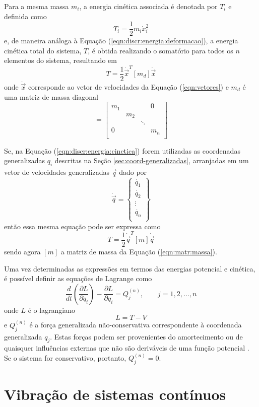 \documentclass[12pt,openright,oneside,a4paper,
	chapter=TITLE,section=TITLE,
	english,brazil]{abntex2}
\begin{document}
	Para a mesma massa $m_i$, a energia cinética associada é denotada por $T_i$ e definida como \cite{rao:2008}
	\begin{equation}
		T_i = \frac{1}{2}m_i\dot{x}_i^2
	\end{equation}
	e, de maneira análoga à Equação (\ref{eqn:discr:energia:deformacao}), a energia cinética total do sistema, $T$, é obtida realizando o somatório para todos os $n$ elementos do sistema, resultando em \cite{savi:2017}
	\begin{equation}\label{eqn:discr:energia:cinetica}
		T = \frac{1}{2}\dot{\vec{x}}^T[m_d]\dot{\vec{x}}
	\end{equation}
	onde $\dot{\vec{x}}$ corresponde ao vetor de velocidades da Equação (\ref{eqn:vetores}) e $m_d$ é uma matriz de massa diagonal
	\begin{equation}
		[m_d] =
		\begin{bmatrix}
			m_1 & & & 0\\
			& m_2\\
			& & \ddots\\
			0 & & & m_n\\
		\end{bmatrix}
	\end{equation}
	
	Se, na Equação (\ref{eqn:discr:energia:cinetica}) forem utilizadas as coordenadas generalizadas $q_i$ descritas na Seção \ref{sec:coord-generalizadas}, arranjadas em um vetor de velocidades generalizadas $\dot{\vec{q}}$ dado por
	\begin{equation}
		\dot{\vec{q}} = 
		\begin{Bmatrix}
			\dot{q_1}\\ \dot{q_2}\\ \vdots\\ \dot{q_n}\\
		\end{Bmatrix}
	\end{equation}
	então essa mesma equação pode ser expressa como \cite{rao:2008}
	\begin{equation}
		T = \frac{1}{2}\dot{\vec{q}}^T[m]\dot{\vec{q}}
	\end{equation}
	sendo agora $[m]$ a matriz de massa da Equação (\ref{eqn:matr:massa}).
	
	Uma vez determinadas as expressões em termos das energias potencial e cinética, é possível definir as equações de Lagrange como \cite{savi:2017}
	\begin{equation} \label{eqn:lagrange}
		\frac{d}{dt}\left(\frac{\partial L}{\partial \dot{q}_i}\right) - \frac{\partial L}{\partial q_i} = Q_j^{(n)}, \qquad j = 1, 2, \dots, n
	\end{equation}
	onde $L$ é o lagrangiano
	\begin{equation}
		L = T-V
	\end{equation}
	e $ Q_j^{(n)} $ é a força generalizada não-conservativa correspondente à coordenada generalizada $q_j$. Estas forças podem ser provenientes do amortecimento ou de quaisquer influências externas que não são deriváveis de uma função potencial \cite{rao:2008}. Se o sistema for conservativo, portanto, $ Q_j^{(n)} = 0 $.
	
	\section{Vibração de sistemas contínuos}
	
	\postextual
	
	
		
\end{document}
